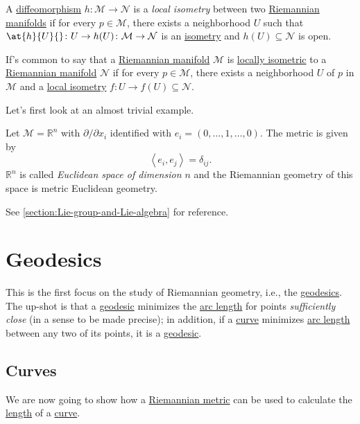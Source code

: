 \begin{definition}\label{def:local-isometry}
	A \hyperref[def:diffeomorphism]{diffeomorphism} \(h\colon \mathcal{M} \to \mathcal{N} \) is a \emph{local isometry} between two \hyperref[def:Riemannian-manifold]{Riemannian manifolds} if for every \(p\in \mathcal{M} \), there exists a neighborhood \(U\) such that \(\at{h}{U}{} \colon U \to  h(U)\colon \mathcal{M} \to \mathcal{N} \) is an \hyperref[def:isometry]{isometry} and \(h(U) \subseteq \mathcal{N} \) is open.
\end{definition}

If's common to say that a \hyperref[def:Riemannian-manifold]{Riemannian manifold} \(\mathcal{M} \) is \hyperref[def:local-isometry]{locally isometric} to a \hyperref[def:Riemannian-manifold]{Riemannian manifold} \(\mathcal{N} \) if for every \(p\in \mathcal{M} \), there exists a neighborhood \(U\) of \(p\) in \(\mathcal{M} \) and a \hyperref[def:local-isometry]{local isometry} \(f\colon U \to f(U) \subseteq \mathcal{N} \).

Let's first look at an almost trivial example.

\begin{eg}
	Let \(\mathcal{M} = \mathbb{R} ^n\) with \(\partial /\partial x_i\) identified with \(e_i =(0, \ldots , 1, \ldots , 0)\). The metric is given by
	\[
		\left\langle e_i, e_j \right\rangle = \delta _{ij}.
	\]
	\(\mathbb{R} ^n\) is called \emph{Euclidean space of dimension \(n\)} and the Riemannian geometry of this space is metric Euclidean geometry.
\end{eg}

\begin{eg}
	See \autoref{section:Lie-group-and-Lie-algebra} for reference.
\end{eg}

\section{Geodesics}
This is the first focus on the study of Riemannian geometry, i.e., the \hyperref[def:geodesic]{geodesics}. The up-shot is that a \hyperref[def:geodesic]{geodesic} minimizes the \hyperref[def:length]{arc length} for points \emph{sufficiently close} (in a sense to be made precise); in addition, if a \hyperref[def:curve]{curve} minimizes \hyperref[def:length]{arc length} between any two of its points, it is a \hyperref[def:geodesic]{geodesic}.

\subsection{Curves}
We are now going to show how a \hyperref[def:Riemannian-metric]{Riemannian metric} can be used to calculate the \hyperref[def:length]{length} of a \hyperref[def:curve]{curve}.


